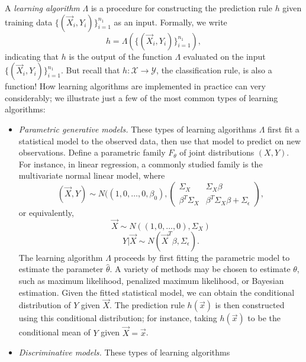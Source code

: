 A \emph{learning algorithm} $\Lambda$ is a procedure for constructing the
prediction rule $h$ given training data $\{(\vec{X}_i,Y_i)\}_{i=1}^{n_1}$ as
an input.  Formally, we write
\[
h = \Lambda(\{(\vec{X}_i,Y_i)\}_{i=1}^{n_1}),
\]
indicating that $h$ is the output of the function $\Lambda$ evaluated
on the input $\{(\vec{X}_i,Y_i)\}_{i=1}^{n_1}$.  But recall that $h:
\mathcal{X} \to \mathcal{Y}$, the classification rule, is also a
function!  How learning algorithms are implemented in practice can
very considerably; we illustrate just a few of the most common types
of learning algorithms:

\begin{itemize}
\item \emph{Parametric generative models.}  These types of learning
  algorithms $\Lambda$ first fit a statistical model to the observed
  data, then use that model to predict on new observations. Define a
  parametric family $F_\theta$ of joint distributions $(X, Y)$.  For
  instance, in linear regression, a commonly studied family is the
  multivariate normal linear model, where
\[
(\vec{X}, Y) \sim N((1,0,\hdots,0, \beta_0), \begin{pmatrix}\Sigma_X & \Sigma_X \beta \\
\beta^T \Sigma_X & \beta^T \Sigma_X \beta + \Sigma_\epsilon\end{pmatrix},
\]
or equivalently,
\[
\vec{X} \sim N((1,0,\hdots,0), \Sigma_X)
\]
\[
Y|\vec{X} \sim N(\vec{X}^T \beta, \Sigma_\epsilon).
\]
The learning algorithm $\Lambda$ proceeds by first fitting the
parametric model to estimate the parameter $\hat{\theta}$.  A variety
of methods may be chosen to estimate $\theta$, such as maximum
likelihood, penalized maximum likelihood, or Bayesian estimation.
Given the fitted statistical model, we can obtain the conditional
distribution of $Y$ given $\vec{X}$.  The prediction rule $h(\vec{x})$
is then constructed using this conditional distribution; for instance,
taking $h(\vec{x})$ to be the conditional mean of $Y$ given $\vec{X} =
\vec{x}$.
\item \emph{Discriminative models.} These types of learning algorithms

\end{itemize}
